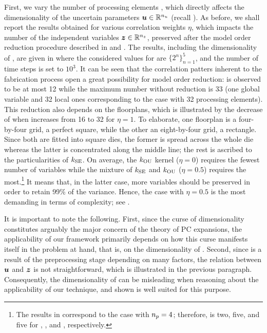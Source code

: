 First, we vary the number of processing elements \np, which directly affects the
dimensionality of the uncertain parameters $\boldsymbol{u} \in \mathbb{R}^{n_{u}}$ (recall
). As before, we shall report the results obtained
for various correlation weights $\eta$, which impacts the number of the
independent variables $\boldsymbol{z} \in \mathbb{R}^{n_{z}}$, preserved after the model order
reduction procedure described in  and
. The results, including the dimensionality \nz of \vz, are
given in  where the considered values for \np
are $\{ 2^n \}_{n = 1}^5$, and the number of time steps \ns is set to $10^3$. It
can be seen that the correlation patters inherent to the fabrication process
\cite{cheng2011} open a great possibility for model order reduction: \nz is
observed to be at most 12 while the maximum number without reduction is 33 (one
global variable and 32 local ones corresponding to the case with 32 processing
elements). This reduction also depends on the floorplans, which is illustrated
by the decrease of \nz when \np increases from 16 to 32 for $\eta = 1$. To
elaborate, one floorplan is a four-by-four grid, a perfect square, while the
other an eight-by-four grid, a rectangle. Since both are fitted into square
dies, the former is spread across the whole die whereas the latter is
concentrated along the middle line; the rest is ascribed to the particularities
of $k_{\mathrm{SE}}$. On average, the $k_{\mathrm{OU}}$ kernel ($\eta = 0$) requires the fewest
number of variables while the mixture of $k_{\mathrm{SE}}$ and $k_{\mathrm{OU}}$ ($\eta = 0.5$)
requires the most.\footnote{The results in  correspond to the
case with ${n_{p}} = 4$; therefore, \nz is two, five, and five for
, , and ,
respectively.} It means that, in the latter case, more variables should be
preserved in order to retain 99\% of the variance. Hence, the case with $\eta =
0.5$ is the most demanding in terms of complexity; see
.

It is important to note the following. First, since the curse of dimensionality
constitutes arguably the major concern of the theory of PC expansions, the
applicability of our framework primarily depends on how this curse manifests
itself in the problem at hand, that is, on the dimensionality \nz of \vz.
Second, since \vz is a result of the preprocessing stage depending on many
factors, the relation between $\boldsymbol{u}$ and $\boldsymbol{z}$ is not straightforward, which is
illustrated in the previous paragraph. Consequently, the dimensionality of \vu
can be misleading when reasoning about the applicability of our technique, and
\nz shown  is well suited for this purpose.

